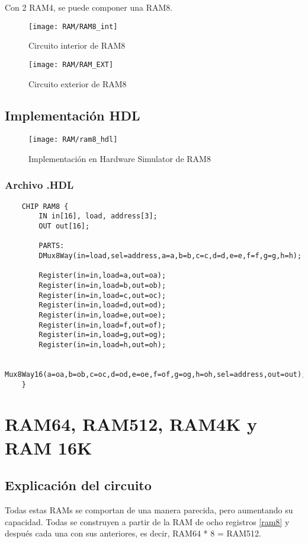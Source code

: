 \documentclass[12pt]{article}
\begin{document}
Con 2 RAM4, se puede componer una RAM8.
\begin{figure}[H]
	\centering
	\texttt{[image: RAM/RAM8\_int]}
	\caption{Circuito interior de RAM8}
	\label{fig:ram8int}
\end{figure}


\begin{figure}[H]
	\centering
	\texttt{[image: RAM/RAM\_EXT]}
	\caption{Circuito exterior de RAM8}
	\label{fig:ramext}
\end{figure}


\subsection{Implementación HDL}
\begin{figure}[H]
	\centering
	\texttt{[image: RAM/ram8\_hdl]}
	\caption{Implementación en Hardware Simulator de RAM8}
	\label{fig:ram8hdl}
\end{figure}

\subsubsection{Archivo .HDL}
\begin{lstlisting}
	CHIP RAM8 {
		IN in[16], load, address[3];
		OUT out[16];

		PARTS:
		DMux8Way(in=load,sel=address,a=a,b=b,c=c,d=d,e=e,f=f,g=g,h=h);

		Register(in=in,load=a,out=oa);
		Register(in=in,load=b,out=ob);
		Register(in=in,load=c,out=oc);
		Register(in=in,load=d,out=od);
		Register(in=in,load=e,out=oe);
		Register(in=in,load=f,out=of);
		Register(in=in,load=g,out=og);
		Register(in=in,load=h,out=oh);

		Mux8Way16(a=oa,b=ob,c=oc,d=od,e=oe,f=of,g=og,h=oh,sel=address,out=out);
	}
\end{lstlisting}


\newpage

\section{RAM64, RAM512, RAM4K y RAM 16K}
    \subsection{Explicación del circuito}
		Todas estas RAMs se comportan de una manera parecida, pero aumentando su capacidad. Todas se construyen a partir de la RAM de ocho registros \ref{ram8} y después cada una con sus anteriores, es decir, RAM64 * 8 = RAM512.
\end{document}
